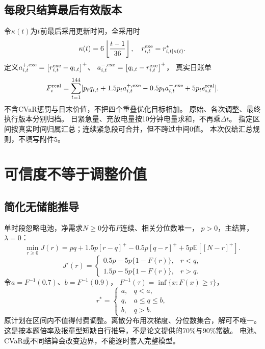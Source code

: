 \documentclass[UTF8,11pt]{ctexart}
\newcommand{\pos}[1]{\left[#1\right]^+}
\newcommand{\E}{\mathbb E}
\begin{document}
\subsection{每段只结算最后有效版本}
令$\kappa(t)$为$t$前最后采用更新时间，全采用时
\begin{equation}
 \kappa(t)=6\left\lfloor\frac{t-1}{36}\right\rfloor,\quad
 r^{\rm exe}_{i,t}=r^*_{i,t|\kappa(t)}.
\end{equation}
定义$a^{+,\rm exe}_{i,t}=\pos{r^{\rm exe}_{i,t}-q_{i,t}}$、
$a^{-,\rm exe}_{i,t}=\pos{q_{i,t}-r^{\rm exe}_{i,t}}$，
真实日账单
\begin{equation}\label{eq:bill}
 F_i^{\rm real}=\sum_{t=1}^{144}
 [p_tq_{i,t}+1.5p_ta^{+,\rm exe}_{i,t}
 -0.5p_ta^{-,\rm exe}_{i,t}+5p_te^{\rm real}_{i,t}].
\end{equation}
不含CVaR惩罚与日末价值，不把四个重叠优化目标相加。
原始、各次调整、最终执行版本分别归档。
日紧急量、充放电量按10分钟电量求和，不再乘$\Delta t$。
指定区间按真实时间归属汇总；连续紧急段可合并，但不跨过中间0值。
本次仅给汇总规则，不填写附件5。

\section{可信度不等于调整价值}
\subsection{简化无储能推导}
单时段忽略电池，净需求$N\geq0$分布$F$连续、相关分位数唯一，
$p>0$，主结算，$\lambda=0$：
\begin{equation}
 \min_{r\geq0}J(r)=pq+1.5p\pos{r-q}-0.5p\pos{q-r}
                  +5p\E[\pos{N-r}].
\end{equation}
\begin{equation}
 J'(r)=\begin{cases}
 0.5p-5p\{1-F(r)\},&r<q,\\
 1.5p-5p\{1-F(r)\},&r>q.
 \end{cases}
\end{equation}
令$a=F^{-1}(0.7)$、$b=F^{-1}(0.9)$，
$F^{-1}(\tau)=\inf\{x:F(x)\geq\tau\}$，
\begin{equation}\label{eq:band}
 r^*=\begin{cases}a,&q<a,\\q,&a\leq q\leq b,\\b,&q>b.\end{cases}
\end{equation}
原计划在区间内不值得付费调整。离散分布用次梯度、分位数集合，解可不唯一。
这是按本题倍率及报童型短缺自行推导，不是论文提供的70\%与90\%常数。
电池、CVaR或不同结算会改变边界，不能逐时套入完整模型。
\end{document}
